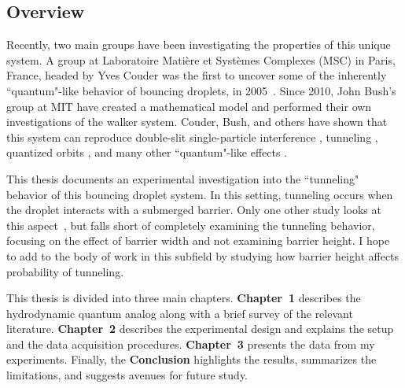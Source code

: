 	  
\subsection*{Overview}	  
	  
	Recently, two main groups have been investigating the properties of this unique system. A group at Laboratoire Mati\`{e}re et Syst\`{e}mes Complexes (MSC) in Paris, France, headed by Yves Couder was the first to uncover some of the inherently ``quantum"-like behavior of bouncing droplets, in 2005~\cite{Couder2005b}. Since 2010, John Bush's group at MIT have created a mathematical model and performed their own investigations of the walker system. Couder, Bush, and others have shown that this system can reproduce double-slit single-particle interference , tunneling , quantized orbits , and many other ``quantum"-like effects . 
		
	This thesis documents an experimental investigation into the ``tunneling" behavior of this bouncing droplet system. In this setting, tunneling occurs when the droplet interacts with a submerged barrier. Only one other study looks at this aspect~\cite{tunneling}, but falls short of completely examining the tunneling behavior, focusing on the effect of barrier width and not examining barrier height. I hope to add to the body of work in this subfield by studying how barrier height affects probability of tunneling.   
	
	This thesis is divided into three main chapters. \textbf{Chapter~1} describes the hydrodynamic quantum analog along with a brief survey of the relevant literature. \textbf{Chapter~2} describes the experimental design and explains the setup and the data acquisition procedures. \textbf{Chapter~3} presents the data from my experiments. Finally, the \textbf{Conclusion} highlights the results, summarizes the limitations, and suggests avenues for future study. 